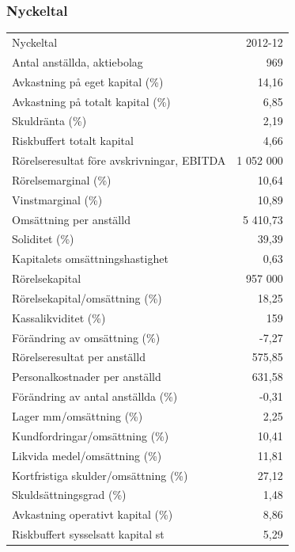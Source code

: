 \documentclass[10pt,a4paper]{article}
\begin{document}
\subsubsection{Nyckeltal}
\begin{tabular}{ l r }
	Nyckeltal & 2012-12\\
	Antal anställda, aktiebolag & 969\\
	Avkastning på eget kapital (\%) & 14,16\\
	Avkastning på totalt kapital (\%) & 6,85\\
	Skuldränta (\%) & 2,19\\
	Riskbuffert totalt kapital & 4,66\\
	Rörelseresultat före avskrivningar, EBITDA & 1 052 000\\
	Rörelsemarginal (\%) & 10,64\\
	Vinstmarginal (\%) & 10,89\\
	Omsättning per anställd & 5 410,73\\
	Soliditet (\%) & 39,39\\
	Kapitalets omsättningshastighet & 0,63\\
	Rörelsekapital & 957 000\\
	Rörelsekapital/omsättning (\%) & 18,25\\
	Kassalikviditet (\%) & 159\\
	Förändring av omsättning (\%) & -7,27\\
	Rörelseresultat per anställd & 575,85\\
	Personalkostnader per anställd & 631,58\\
	Förändring av antal anställda (\%) & -0,31\\
	Lager mm/omsättning (\%) & 2,25\\
	Kundfordringar/omsättning (\%) & 10,41\\
	Likvida medel/omsättning (\%) & 11,81\\
	Kortfristiga skulder/omsättning (\%) & 27,12\\
	Skuldsättningsgrad (\%) & 1,48\\
	Avkastning operativt kapital (\%) & 8,86\\
	Riskbuffert sysselsatt kapital st & 5,29\\
\end{tabular}
\end{document}
